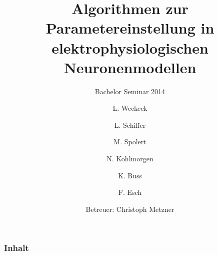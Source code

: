 \documentclass[12pt]{beamer}
\title{Algorithmen zur Parametereinstellung in elektrophysiologischen Neuronenmodellen}
\subtitle{Bachelor Seminar 2014}
\author{L. Weckeck \and L. Schiffer \and M. Spolert \and N. Kohlmorgen \and K. Buss \and F. Esch}
\institute{
  Institut für Robotik und Kognitive Systeme\\
  Universität zu Lübeck
}
\date{Betreuer: Christoph Metzner}
\begin{document}
\begin{frame}
  \titlepage
\end{frame}

\begin{frame}
  \frametitle{Inhalt}
  \tableofcontents
\end{frame}



\end{document}
